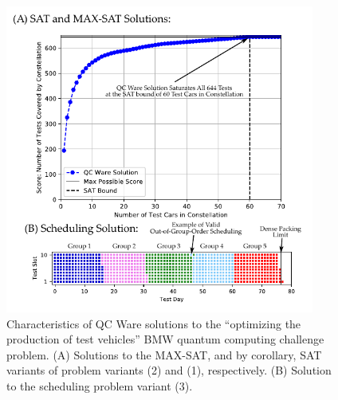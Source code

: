 \documentclass[aps,pra,twocolumn,superscriptaddress,groupedaddress]{revtex4}  %
\begin{document}
\begin{figure}[ht]
\begin{center}
\includegraphics[width=4in]{figures/solution.pdf}
\caption{Characteristics of QC Ware solutions to the ``optimizing the production
of test vehicles'' BMW quantum computing challenge problem. (A) Solutions
to the MAX-SAT, and by corollary, SAT variants of problem variants (2) and (1),
respectively. (B) Solution to the scheduling problem variant (3).}
\label{fig:solution}
\end{center}
\end{figure}
\end{document}
